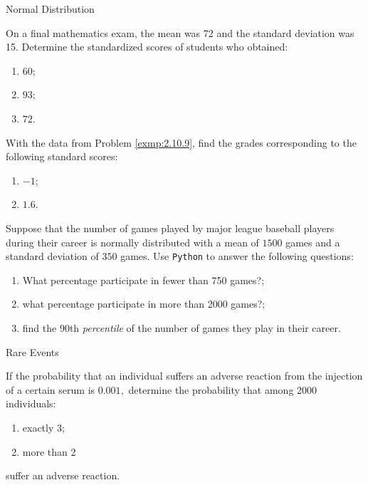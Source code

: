 {Normal Distribution}
\begin{ejemplo}
  \label{exmp:2.10.9}
  On a final mathematics exam, the mean was 72 and the standard deviation was 15. Determine the standardized scores of students who obtained:
  \begin{enumerate}
   \item $60$;
   \item $93$;
   \item $72$.
  \end{enumerate}
\end{ejemplo}

\begin{ejemplo}
   \label{exmp:2.10.10}
   With the data from Problem \ref{exmp:2.10.9}, find the grades corresponding to the following standard scores:
  \begin{enumerate}
   \item $-1$;
   \item $1.6$.
  \end{enumerate}
\end{ejemplo}

\begin{ejemplo}
  \label{exmp:2.10.11}
  Suppose that the number of games played by major league baseball players during their career is normally distributed with a mean of $1500$ games and a standard deviation of $350$ games. Use \texttt{Python} to answer the following questions:
  \begin{enumerate}
   \item What percentage participate in fewer than 750 games?;
   \item what percentage participate in more than 2000 games?;
   \item find the $90$th \emph{percentile} of the number of games they play in their career.
  \end{enumerate}
\end{ejemplo}



{Rare Events}
\begin{ejemplo}
\label{exmp:2.10.12}
  If the probability that an individual suffers an adverse reaction from the injection of a certain serum is $0.001,$ determine the probability that among 2000 individuals:
 \begin{enumerate}
  \item exactly 3;
  \item more than 2
 \end{enumerate}
suffer an adverse reaction.
\end{ejemplo}

